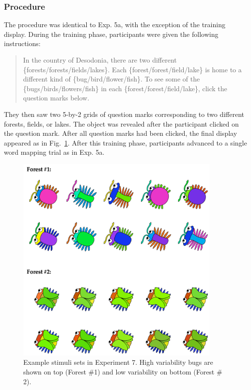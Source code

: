 \subsubsection{Procedure}
The procedure was identical to Exp. 5a, with the exception of the training display. During the training phase, participants were given the following instructions:

\begin{quote}
In the country of Desodonia, there are two different \{forests/forests/fields/lakes\}. Each \{forest/forest/field/lake\}  is home to a different kind of \{bug/bird/flower/fish\}. To see some of the \{bugs/birds/flowers/fish\} in each \{forest/forest/field/lake\}, click the question marks below.
\end{quote}

They then saw two 5-by-2 grids of question marks corresponding to two different forests, fields, or lakes. The object was revealed after the participant clicked on the question mark. After all question marks had been clicked, the final display appeared as in Fig.\ \ref{fig:var_screen_shot}. After this training phase, participants advanced to a single word mapping trial as in Exp. 5a. 


  \begin{figure}
 \begin{center}
  \includegraphics[width=4in]{figs/var_screen_shot.png}
  \caption{\label{fig:var_screen_shot} Example stimuli sets in Experiment 7. High variability bugs are shown on top (Forest \#1) and low variability on bottom (Forest \# 2).}
 \end{center}
\end{figure}




